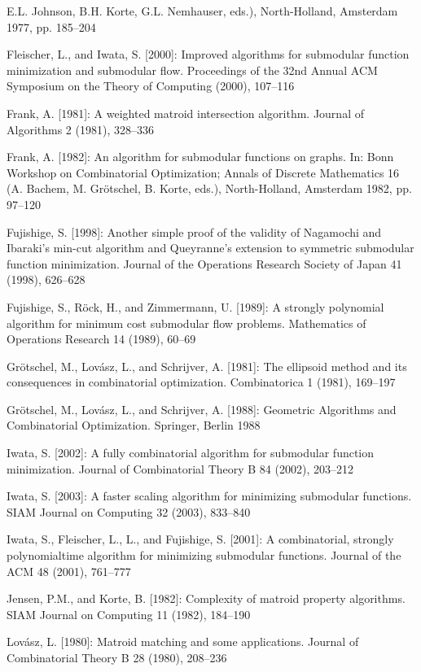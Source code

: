 {\small\setlength{\parindent}{0pt}\setlength{\parskip}{5pt}\sloppy
E.L. Johnson, B.H. Korte, G.L. Nemhauser, eds.), North-Holland, Amsterdam 1977, pp. 185–204\par
Fleischer, L., and Iwata, S. [2000]: Improved algorithms for submodular function minimization and submodular flow. Proceedings of the 32nd Annual ACM Symposium on the Theory of Computing (2000), 107–116\par
Frank, A. [1981]: A weighted matroid intersection algorithm. Journal of Algorithms 2 (1981), 328–336\par
Frank, A. [1982]: An algorithm for submodular functions on graphs. In: Bonn Workshop on Combinatorial Optimization; Annals of Discrete Mathematics 16 (A. Bachem, M. Grötschel, B. Korte, eds.), North-Holland, Amsterdam 1982, pp. 97–120\par
Fujishige, S. [1998]: Another simple proof of the validity of Nagamochi and Ibaraki’s min-cut algorithm and Queyranne’s extension to symmetric submodular function minimization. Journal of the Operations Research Society of Japan 41 (1998), 626–628\par
Fujishige, S., Röck, H., and Zimmermann, U. [1989]: A strongly polynomial algorithm for minimum cost submodular flow problems. Mathematics of Operations Research 14 (1989), 60–69\par
Grötschel, M., Lovász, L., and Schrijver, A. [1981]: The ellipsoid method and its consequences in combinatorial optimization. Combinatorica 1 (1981), 169–197\par
Grötschel, M., Lovász, L., and Schrijver, A. [1988]: Geometric Algorithms and Combinatorial Optimization. Springer, Berlin 1988\par
Iwata, S. [2002]: A fully combinatorial algorithm for submodular function minimization. Journal of Combinatorial Theory B 84 (2002), 203–212\par
Iwata, S. [2003]: A faster scaling algorithm for minimizing submodular functions. SIAM Journal on Computing 32 (2003), 833–840\par
Iwata, S., Fleischer, L., L., and Fujishige, S. [2001]: A combinatorial, strongly polynomialtime algorithm for minimizing submodular functions. Journal of the ACM 48 (2001), 761–777\par
Jensen, P.M., and Korte, B. [1982]: Complexity of matroid property algorithms. SIAM Journal on Computing 11 (1982), 184–190\par
Lovász, L. [1980]: Matroid matching and some applications. Journal of Combinatorial Theory B 28 (1980), 208–236\par
}
